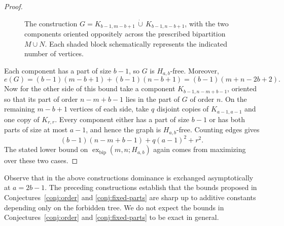 \documentclass[10pt,a4paper]{amsart}
\newcommand{\exbip}{\operatorname{ex}_{\mathrm{bip}}}
\begin{document}
\begin{proof}
\begin{figure}[ht]

    \caption{The construction
    \(G=K_{b-1,m-b+1}\,\dot\cup\,
    K_{b-1,n-b+1}\), with the two components oriented oppositely
    across the prescribed bipartition \(M\cup N\). Each shaded block
    schematically represents the indicated number of vertices.}
    \label{fig:fixed-part-lower-bound}
\end{figure}
    
    Each component has a part of size $b-1$, so $G$ is $H_{a,b}$-free. Moreover,
    \[
        e(G)=(b-1)(m-b+1)+(b-1)(n-b+1)=(b-1)(m+n-2b+2).
    \]
    Now for the other side of this bound take a component $K_{b-1,n-m+b-1}$, oriented so that its part of order $n-m+b-1$ lies in the part of $G$ of order $n$. On the remaining $m-b+1$ vertices of each side, take $q$ disjoint copies of $K_{a-1,a-1}$ and one copy of $K_{r,r}$. Every component either has a part of size $b-1$ or has both parts of size at most $a-1$, and hence the graph is $H_{a,b}$-free. Counting edges gives
    \[
        (b-1)(n-m+b-1)+q(a-1)^2+r^2.
    \]
    The stated lower bound on $\exbip(m,n;H_{a,b})$ again comes from maximizing over these two cases.
\end{proof}

Observe that in the above constructions dominance is exchanged asymptotically at $a=2b-1$. The preceding constructions establish that the bounds proposed in Conjectures~\ref{conj:order} and \ref{conj:fixed-parts} are sharp up to additive constants depending only on the forbidden tree. We do not expect the bounds in Conjectures~\ref{conj:order} and \ref{conj:fixed-parts} to be exact in general.
\end{document}
